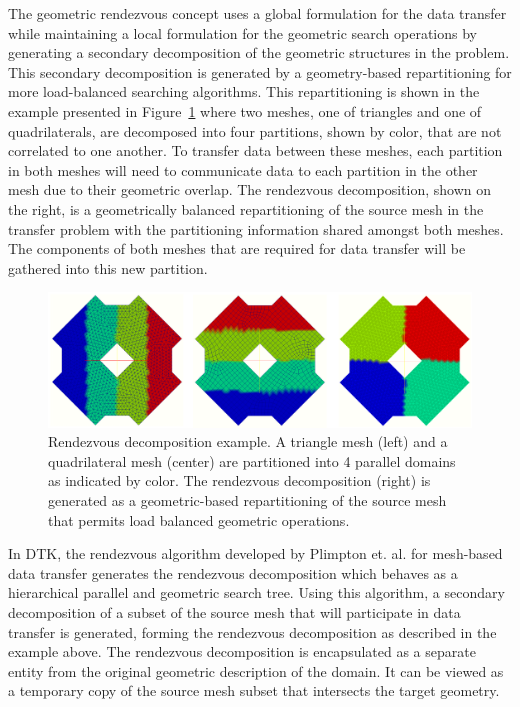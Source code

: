 \documentclass{mc2013}
\begin{document}
\label{subsec:rendezvous_algorithm}

The geometric rendezvous concept uses a global formulation for the
data transfer while maintaining a local formulation for the geometric
search operations by generating a secondary decomposition of the
geometric structures in the problem. This secondary decomposition is
generated by a geometry-based repartitioning for more load-balanced
searching algorithms. This repartitioning is shown in the example
presented in Figure~\ref{fig:rendezvous_example} where two meshes, one
of triangles and one of quadrilaterals, are decomposed into four
partitions, shown by color, that are not correlated to one another. To
transfer data between these meshes, each partition in both meshes will
need to communicate data to each partition in the other mesh due to
their geometric overlap. The rendezvous decomposition, shown on the
right, is a geometrically balanced repartitioning of the source mesh
in the transfer problem with the partitioning information shared
amongst both meshes. The components of both meshes that are required
for data transfer will be gathered into this new partition.
\begin{figure}[htpb!]
  \centering \includegraphics[width=6in]{rendezvous_example.png}
  \caption{Rendezvous decomposition example. A triangle mesh (left)
    and a quadrilateral mesh (center) are partitioned into 4 parallel
    domains as indicated by color. The rendezvous decomposition
    (right) is generated as a geometric-based repartitioning of the
    source mesh that permits load balanced geometric operations.}
  \label{fig:rendezvous_example}
\end{figure}

In DTK, the rendezvous algorithm developed by Plimpton
et. al. \cite{Plimpton_2004} for mesh-based data transfer generates
the rendezvous decomposition which behaves as a hierarchical parallel
and geometric search tree.  Using this algorithm, a secondary
decomposition of a subset of the source mesh that will participate in
data transfer is generated, forming the rendezvous decomposition as
described in the example above. The rendezvous decomposition is
encapsulated as a separate entity from the original geometric
description of the domain. It can be viewed as a temporary copy of the
source mesh subset that intersects the target geometry.
\end{document}
